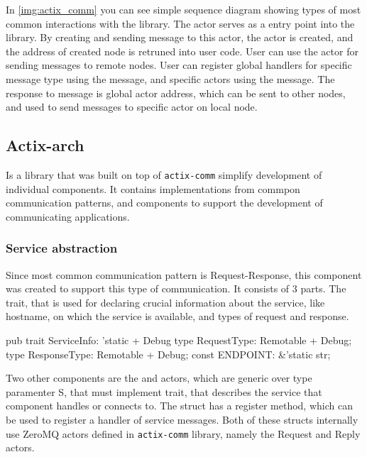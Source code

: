 In \autoref{img:actix_comm} you can see simple sequence diagram showing types of most common interactions with the library. The 
actor serves as a entry point into the library. By creating and sending  message to this actor, the  actor is created,
and the address of created node is retruned into user code. User can use the  actor for sending messages to
remote nodes. User can register global handlers for specific message type
using the  message, and specific actors using the  message. The response to 
message is global actor address, which can be sent to other nodes, and used to send messages to specific actor on local node.


\subsection{Actix-arch}
Is a library that was built on top of \verb|actix-comm| simplify development of individual components. It contains implementations
from commpon communication patterns, and components to support the development of communicating applications.

\subsubsection{Service abstraction}
Since most common communication pattern is Request-Response, this component was created to support this type of communication.
It consists of 3 parts. The  trait, that is used for declaring crucial information about the service, like
hostname, on which the service is available, and types of request and response.

\begin{code}[language=rust,label={svcinfo_trait},caption={ServiceInfo trait definition}]
pub trait ServiceInfo: 'static + Debug {
    type RequestType: Remotable + Debug;
    type ResponseType: Remotable + Debug;
    const ENDPOINT: &'static str;
}
\end{code}

Two other components are the and  actors, which are generic over type paramenter
S, that must implement  trait, that describes the service that component handles or connects to.
The  struct has a register method, which can be used to register a handler of service messages.
Both of these structs internally use ZeroMQ actors defined in \verb|actix-comm| library, namely the Request and Reply actors.

